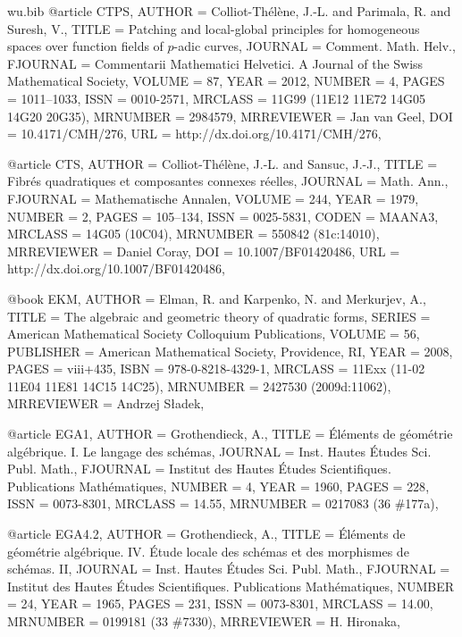\documentclass{amsart}
\numberwithin{equation}{section}
\theoremstyle{plain}
\theoremstyle{definition}
\begin{document}
\begin{filecontents}{wu.bib}
@article {CTPS, 
    AUTHOR = {Colliot-Th{\'e}l{\`e}ne, J.-L. and Parimala, R. and
              Suresh, V.},
     TITLE = {Patching and local-global principles for homogeneous spaces
              over function fields of {$p$}-adic curves},
   JOURNAL = {Comment. Math. Helv.},
  FJOURNAL = {Commentarii Mathematici Helvetici. A Journal of the Swiss
              Mathematical Society},
    VOLUME = {87},
      YEAR = {2012},
    NUMBER = {4},
     PAGES = {1011--1033},
      ISSN = {0010-2571},
   MRCLASS = {11G99 (11E12 11E72 14G05 14G20 20G35)},
  MRNUMBER = {2984579},
MRREVIEWER = {Jan van Geel},
       DOI = {10.4171/CMH/276},
       URL = {http://dx.doi.org/10.4171/CMH/276},
}

@article {CTS, 
    AUTHOR = {Colliot-Th{\'e}l{\`e}ne, J.-L. and Sansuc, J.-J.},
     TITLE = {Fibr\'es quadratiques et composantes connexes r\'eelles},
   JOURNAL = {Math. Ann.},
  FJOURNAL = {Mathematische Annalen},
    VOLUME = {244},
      YEAR = {1979},
    NUMBER = {2},
     PAGES = {105--134},
      ISSN = {0025-5831},
     CODEN = {MAANA3},
   MRCLASS = {14G05 (10C04)},
  MRNUMBER = {550842 (81c:14010)},
MRREVIEWER = {Daniel Coray},
       DOI = {10.1007/BF01420486},
       URL = {http://dx.doi.org/10.1007/BF01420486},
}

@book {EKM, 
    AUTHOR = {Elman, R. and Karpenko, N. and Merkurjev, A.},
     TITLE = {The algebraic and geometric theory of quadratic forms},
    SERIES = {American Mathematical Society Colloquium Publications},
    VOLUME = {56},
 PUBLISHER = {American Mathematical Society, Providence, RI},
      YEAR = {2008},
     PAGES = {viii+435},
      ISBN = {978-0-8218-4329-1},
   MRCLASS = {11Exx (11-02 11E04 11E81 14C15 14C25)},
  MRNUMBER = {2427530 (2009d:11062)},
MRREVIEWER = {Andrzej S{\l}adek},
}

@article {EGA1, 
    AUTHOR = {Grothendieck, A.},
     TITLE = {\'{E}l\'ements de g\'eom\'etrie alg\'ebrique. {I}. {L}e
              langage des sch\'emas},
   JOURNAL = {Inst. Hautes \'Etudes Sci. Publ. Math.},
  FJOURNAL = {Institut des Hautes \'Etudes Scientifiques. Publications
              Math\'ematiques},
    NUMBER = {4},
      YEAR = {1960},
     PAGES = {228},
      ISSN = {0073-8301},
   MRCLASS = {14.55},
  MRNUMBER = {0217083 (36 \#177a)},
}

@article {EGA4.2, 
    AUTHOR = {Grothendieck, A.},
     TITLE = {\'{E}l\'ements de g\'eom\'etrie alg\'ebrique. {IV}. \'{E}tude
              locale des sch\'emas et des morphismes de sch\'emas. {II}},
   JOURNAL = {Inst. Hautes \'Etudes Sci. Publ. Math.},
  FJOURNAL = {Institut des Hautes \'Etudes Scientifiques. Publications
              Math\'ematiques},
    NUMBER = {24},
      YEAR = {1965},
     PAGES = {231},
      ISSN = {0073-8301},
   MRCLASS = {14.00},
  MRNUMBER = {0199181 (33 \#7330)},
MRREVIEWER = {H. Hironaka},
}


\end{filecontents}
\end{document}
